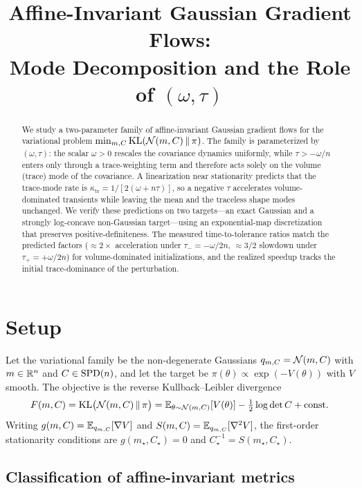\documentclass[11pt]{article}
\title{Affine-Invariant Gaussian Gradient Flows:\\
Mode Decomposition and the Role of $(\omega,\tau)$}
\author{}
\date{}
\begin{document}
\maketitle

\begin{abstract}
We study a two-parameter family of affine-invariant Gaussian gradient flows for
the variational problem $\min_{m,C}\mathrm{KL}(\mathcal{N}(m,C)\,\|\,\pi)$. The family is
parameterized by $(\omega,\tau)$: the scalar $\omega>0$ rescales the covariance
dynamics uniformly, while $\tau>-\omega/n$ enters only through a trace-weighting
term and therefore acts solely on the volume (trace) mode of the covariance. A
linearization near stationarity predicts that the trace-mode rate is
$\kappa_{\mathrm{tr}}=1/[2(\omega+n\tau)]$, so a negative $\tau$ accelerates
volume-dominated transients while leaving the mean and the traceless
shape modes unchanged. We verify these predictions on two targets---an exact
Gaussian and a strongly log-concave non-Gaussian target---using an
exponential-map discretization that preserves positive-definiteness. The
measured time-to-tolerance ratios match the predicted factors ($\approx 2\times$
acceleration under $\tau_-=-\omega/2n$, $\approx 3/2$ slowdown under
$\tau_+=+\omega/2n$) for volume-dominated initializations, and the realized
speedup tracks the initial trace-dominance of the perturbation.
\end{abstract}

\section{Setup}

Let the variational family be the non-degenerate Gaussians $q_{m,C}=\mathcal{N}(m,C)$ with
$m\in\mathbb{R}^{n}$ and $C\in\mathrm{SPD}(n)$, and let the target be
$\pi(\theta)\propto\exp(-V(\theta))$ with $V$ smooth. The objective is the
reverse Kullback--Leibler divergence
\begin{equation}
F(m,C)=\mathrm{KL}\big(\mathcal{N}(m,C)\,\|\,\pi\big)
      =\mathbb{E}_{\theta\sim\mathcal{N}(m,C)}[V(\theta)]-\tfrac12\log\det C + \text{const}.
\end{equation}
Writing $g(m,C)=\mathbb{E}_{q_{m,C}}[\nabla V]$ and $S(m,C)=\mathbb{E}_{q_{m,C}}[\nabla^2 V]$, the
first-order stationarity conditions are $g(m_\star,C_\star)=0$ and
$C_\star^{-1}=S(m_\star,C_\star)$.

\subsection{Classification of affine-invariant metrics}
\end{document}
